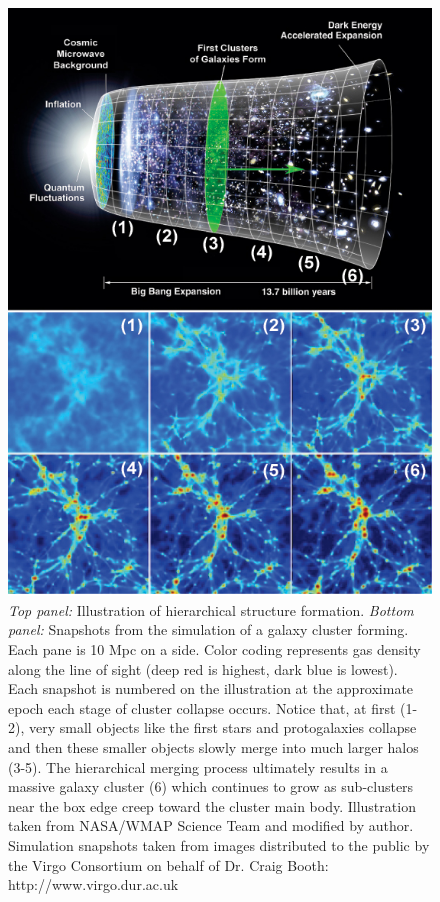 \begin{figure}[htp]
  \begin{center}
    \includegraphics*[height=0.7\textheight, trim=0mm 0mm 0mm 0mm, clip]{bigbang2}
    \caption[Figures illustrating of large scale structure
      formation.]{{\it{Top panel:}} Illustration of hierarchical structure
      formation. {\it{Bottom panel:}} Snapshots from the simulation of a
      galaxy cluster forming. Each pane is 10 Mpc on a side. Color coding
      represents gas density along the line of sight (deep red is highest,
      dark blue is lowest). Each snapshot is numbered on the illustration
      at the approximate epoch each stage of cluster collapse
      occurs. Notice that, at first (1-2), very small objects like the
      first stars and protogalaxies collapse and then these smaller
      objects slowly merge into much larger halos (3-5). The hierarchical
      merging process ultimately results in a massive galaxy cluster (6)
      which continues to grow as sub-clusters near the box edge creep
      toward the cluster main body. Illustration taken from NASA/WMAP
      Science Team and modified by author. Simulation snapshots taken from
      images distributed to the public by the Virgo Consortium on behalf
      of Dr. Craig Booth: http://www.virgo.dur.ac.uk}
    \label{fig:bigbang}
  \end{center}
\end{figure}

